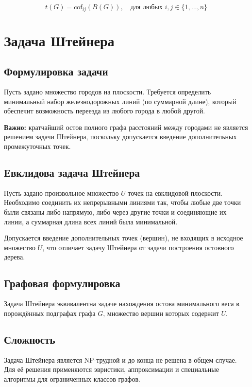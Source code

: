 {\[
t(G) = \text{cof}_{ij}(B(G)),\quad \text{для любых } i, j \in \{1, \ldots, n\}
\]

\section*{Задача Штейнера}

\subsection*{Формулировка задачи}

Пусть задано множество городов на плоскости. Требуется определить минимальный набор железнодорожных линий (по суммарной длине), который обеспечит возможность переезда из любого города в любой другой.

\textbf{Важно:} кратчайший остов полного графа расстояний между городами не является решением задачи Штейнера, поскольку допускается введение дополнительных промежуточных точек.

\subsection*{Евклидова задача Штейнера}

Пусть задано произвольное множество $U$ точек на евклидовой плоскости.  
Необходимо соединить их непрерывными линиями так, чтобы любые две точки были связаны либо напрямую, либо через другие точки и соединяющие их линии, а суммарная длина всех линий была минимальной.

Допускается введение дополнительных точек (вершин), не входящих в исходное множество $U$, что отличает задачу Штейнера от задачи построения остовного дерева.

\subsection*{Графовая формулировка}

Задача Штейнера эквивалентна задаче нахождения остова минимального веса в порождённых подграфах графа $G$, множество вершин которых содержит $U$.

\subsection*{Сложность}

Задача Штейнера является NP-трудной и до конца не решена в общем случае.  
Для её решения применяются эвристики, аппроксимации и специальные алгоритмы для ограниченных классов графов.




    \newpage
}
